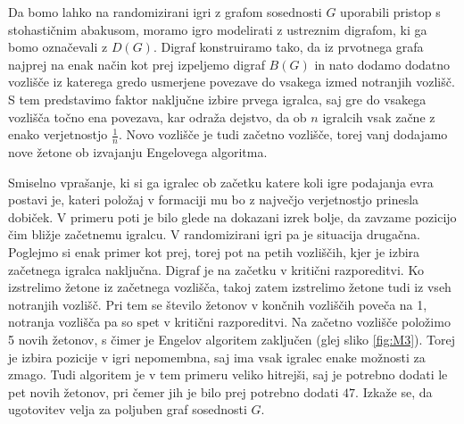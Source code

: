 \documentclass[twoside,11pt]{article}
\begin{document}
Da bomo lahko na randomizirani igri z grafom sosednosti $G$ uporabili pristop s stohastičnim abakusom, moramo igro modelirati z ustreznim digrafom, ki ga bomo označevali z $D(G)$.
Digraf konstruiramo tako, da iz prvotnega grafa najprej na enak način kot prej izpeljemo digraf $B(G)$ in nato dodamo dodatno vozlišče iz katerega gredo usmerjene povezave do vsakega izmed notranjih vozlišč. 
S tem predstavimo faktor naključne izbire prvega igralca, saj gre do vsakega vozlišča točno ena povezava, kar odraža dejstvo, da ob $n$ 
igralcih vsak začne z enako verjetnostjo $\frac{1}{n}$. Novo vozlišče je tudi začetno vozlišče, torej vanj dodajamo nove žetone ob izvajanju Engelovega algoritma.

Smiselno vprašanje, ki si ga igralec ob začetku katere koli igre podajanja evra postavi je, kateri položaj v formaciji mu bo z največjo verjetnostjo prinesla dobiček. V primeru poti je bilo glede na dokazani izrek bolje, da zavzame pozicijo čim bližje začetnemu igralcu.
V randomizirani igri pa je situacija drugačna. Poglejmo si enak primer kot prej, torej pot na petih vozliščih, kjer je izbira začetnega igralca naključna. Digraf je na začetku v kritični razporeditvi.
Ko izstrelimo žetone iz začetnega vozlišča, takoj zatem izstrelimo žetone tudi iz vseh notranjih vozlišč. Pri tem se število žetonov v končnih vozliščih poveča na 1, notranja vozlišča pa so spet v kritični razporeditvi. Na začetno vozlišče položimo 5 novih žetonov, s čimer je Engelov algoritem zaključen (glej sliko \ref{fig:M3}).
Torej je izbira pozicije v igri nepomembna, saj ima vsak igralec enake možnosti za zmago. Tudi algoritem je v tem primeru veliko hitrejši, saj je potrebno dodati le pet novih žetonov, pri čemer jih je bilo prej potrebno dodati $47$. Izkaže se, da ugotovitev velja za poljuben graf sosednosti $G$.
\end{document}
